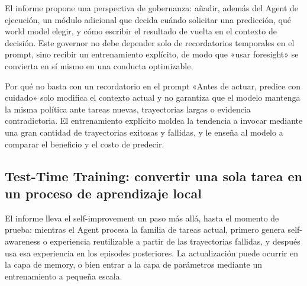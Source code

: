 El informe propone una perspectiva de gobernanza: añadir, además del Agent de ejecución, un módulo adicional que decida cuándo solicitar una predicción, qué world model elegir, y cómo escribir el resultado de vuelta en el contexto de decisión. Este governor no debe depender solo de recordatorios temporales en el prompt, sino recibir un entrenamiento explícito, de modo que «usar foresight» se convierta en sí mismo en una conducta optimizable.



\begin{knowledgebox}{Por qué no basta con un recordatorio en el prompt}
«Antes de actuar, predice con cuidado» solo modifica el contexto actual y no garantiza que el modelo mantenga la misma política ante tareas nuevas, trayectorias largas o evidencia contradictoria. El entrenamiento explícito moldea la tendencia a invocar mediante una gran cantidad de trayectorias exitosas y fallidas, y le enseña al modelo a comparar el beneficio y el costo de predecir.
\end{knowledgebox}

\subsection{Test-Time Training: convertir una sola tarea en un proceso de aprendizaje local}

El informe lleva el self-improvement un paso más allá, hasta el momento de prueba: mientras el Agent procesa la familia de tareas actual, primero genera self-awareness o experiencia reutilizable a partir de las trayectorias fallidas, y después usa esa experiencia en los episodes posteriores. La actualización puede ocurrir en la capa de memory, o bien entrar a la capa de parámetros mediante un entrenamiento a pequeña escala.



